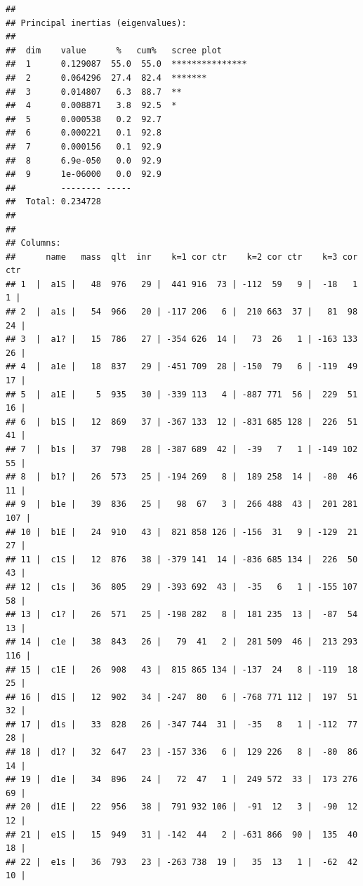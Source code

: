 \documentclass[
  finnish,
]{book}
\begin{document}
\begin{verbatim}
## 
## Principal inertias (eigenvalues):
## 
##  dim    value      %   cum%   scree plot               
##  1      0.129087  55.0  55.0  ***************          
##  2      0.064296  27.4  82.4  *******                  
##  3      0.014807   6.3  88.7  **                       
##  4      0.008871   3.8  92.5  *                        
##  5      0.000538   0.2  92.7                           
##  6      0.000221   0.1  92.8                           
##  7      0.000156   0.1  92.9                           
##  8      6.9e-050   0.0  92.9                           
##  9      1e-06000   0.0  92.9                           
##         -------- -----                                 
##  Total: 0.234728                                       
## 
## 
## Columns:
##      name   mass  qlt  inr    k=1 cor ctr    k=2 cor ctr    k=3 cor ctr  
## 1  |  a1S |   48  976   29 |  441 916  73 | -112  59   9 |  -18   1   1 |
## 2  |  a1s |   54  966   20 | -117 206   6 |  210 663  37 |   81  98  24 |
## 3  |  a1? |   15  786   27 | -354 626  14 |   73  26   1 | -163 133  26 |
## 4  |  a1e |   18  837   29 | -451 709  28 | -150  79   6 | -119  49  17 |
## 5  |  a1E |    5  935   30 | -339 113   4 | -887 771  56 |  229  51  16 |
## 6  |  b1S |   12  869   37 | -367 133  12 | -831 685 128 |  226  51  41 |
## 7  |  b1s |   37  798   28 | -387 689  42 |  -39   7   1 | -149 102  55 |
## 8  |  b1? |   26  573   25 | -194 269   8 |  189 258  14 |  -80  46  11 |
## 9  |  b1e |   39  836   25 |   98  67   3 |  266 488  43 |  201 281 107 |
## 10 |  b1E |   24  910   43 |  821 858 126 | -156  31   9 | -129  21  27 |
## 11 |  c1S |   12  876   38 | -379 141  14 | -836 685 134 |  226  50  43 |
## 12 |  c1s |   36  805   29 | -393 692  43 |  -35   6   1 | -155 107  58 |
## 13 |  c1? |   26  571   25 | -198 282   8 |  181 235  13 |  -87  54  13 |
## 14 |  c1e |   38  843   26 |   79  41   2 |  281 509  46 |  213 293 116 |
## 15 |  c1E |   26  908   43 |  815 865 134 | -137  24   8 | -119  18  25 |
## 16 |  d1S |   12  902   34 | -247  80   6 | -768 771 112 |  197  51  32 |
## 17 |  d1s |   33  828   26 | -347 744  31 |  -35   8   1 | -112  77  28 |
## 18 |  d1? |   32  647   23 | -157 336   6 |  129 226   8 |  -80  86  14 |
## 19 |  d1e |   34  896   24 |   72  47   1 |  249 572  33 |  173 276  69 |
## 20 |  d1E |   22  956   38 |  791 932 106 |  -91  12   3 |  -90  12  12 |
## 21 |  e1S |   15  949   31 | -142  44   2 | -631 866  90 |  135  40  18 |
## 22 |  e1s |   36  793   23 | -263 738  19 |   35  13   1 |  -62  42  10 |

\end{verbatim}
\end{document}
